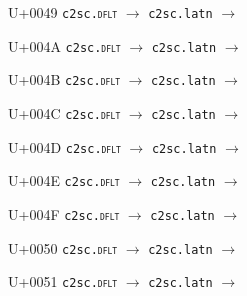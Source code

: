 \documentclass{article}
\begin{document}
\begin{substitutions}
\goodbreak

U+0049  \linebreak
    \texttt{c2sc.\textsc{dflt}} $\to$  \linebreak
    \texttt{c2sc.latn} $\to$  

\goodbreak

U+004A  \linebreak
    \texttt{c2sc.\textsc{dflt}} $\to$  \linebreak
    \texttt{c2sc.latn} $\to$  

\goodbreak

U+004B  \linebreak
    \texttt{c2sc.\textsc{dflt}} $\to$  \linebreak
    \texttt{c2sc.latn} $\to$  

\goodbreak

U+004C  \linebreak
    \texttt{c2sc.\textsc{dflt}} $\to$  \linebreak
    \texttt{c2sc.latn} $\to$  

\goodbreak

U+004D  \linebreak
    \texttt{c2sc.\textsc{dflt}} $\to$  \linebreak
    \texttt{c2sc.latn} $\to$  

\goodbreak

U+004E  \linebreak
    \texttt{c2sc.\textsc{dflt}} $\to$  \linebreak
    \texttt{c2sc.latn} $\to$  

\goodbreak

U+004F  \linebreak
    \texttt{c2sc.\textsc{dflt}} $\to$  \linebreak
    \texttt{c2sc.latn} $\to$  

\goodbreak

U+0050  \linebreak
    \texttt{c2sc.\textsc{dflt}} $\to$  \linebreak
    \texttt{c2sc.latn} $\to$  

\goodbreak

U+0051  \linebreak
    \texttt{c2sc.\textsc{dflt}} $\to$  \linebreak
    \texttt{c2sc.latn} $\to$  


\end{substitutions}
\end{document}
